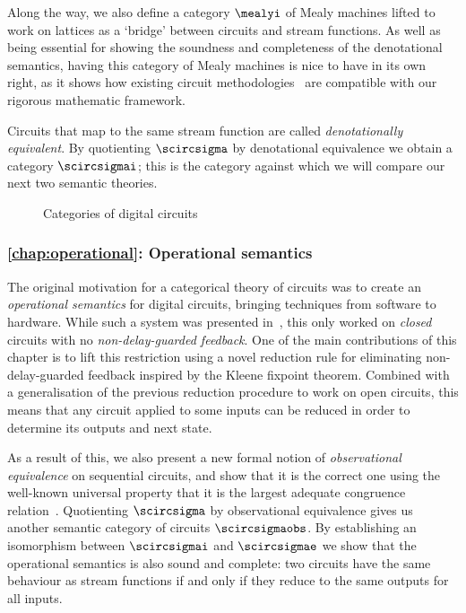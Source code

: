 Along the way, we also define a category \(\mealyi\)  of Mealy machines lifted
to work on lattices as a `bridge' between circuits and stream functions.
As well as being essential for showing the soundness and completeness of the
denotational semantics, having this category of Mealy machines is nice to have
in its own right, as it shows how existing circuit
methodologies~\cite{kohavi2009switching} are compatible with our rigorous
mathematic framework.

Circuits that map to the same stream function are called
\emph{denotationally equivalent}.
By quotienting \(\scircsigma\) by denotational equivalence we obtain a category
\(\scircsigmai\); this is the category against which we will compare our next
two semantic theories.


\begin{figure}
    \centering
    
    \caption{Categories of digital circuits}
    \label{fig:circuits-map}
\end{figure}

\subsubsection{\cref{chap:operational}: Operational semantics}

The original motivation for a categorical theory of circuits was to create an
\emph{operational semantics} for digital circuits, bringing techniques from
software to hardware.
While such a system was presented in~\cite{ghica2017diagrammatic}, this only
worked on \emph{closed} circuits with no \emph{non-delay-guarded feedback}.
One of the main contributions of this chapter is to lift this restriction using
a novel reduction rule for eliminating non-delay-guarded feedback inspired by
the Kleene fixpoint theorem.
Combined with a generalisation of the previous reduction procedure to
work on open circuits, this means that any circuit applied to some inputs can be
reduced in order to determine its outputs and next state.

As a result of this, we also present a new formal notion of
\emph{observational equivalence} on sequential circuits, and show that it is the
correct one using the well-known universal property that it is the largest
adequate congruence relation~\cite{gordon1998operational}.
Quotienting \(\scircsigma\) by observational equivalence gives us another
semantic category of circuits \(\scircsigmaobs\).
By establishing an isomorphism between \(\scircsigmai\) and \(\scircsigmae\)
we show that the operational semantics is also sound and complete: two circuits
have the same behaviour as stream functions if and only if they reduce to the
same outputs for all inputs.

